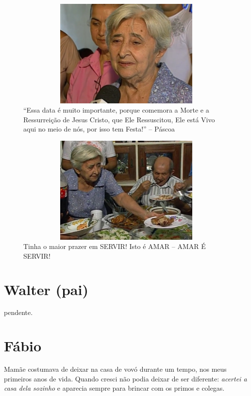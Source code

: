 \documentclass[
  brazil,
  a6paper,
  oneside,
  landscape,
  14pt]{scrbook}
\begin{document}
\begin{figure}
\centering
\includegraphics[width=4.49768in,height=2.13048in]{img/lourdes/image3.jpeg}
\caption{``Essa data é muito importante, porque comemora a Morte e a
Ressurreição de Jesus Cristo, que Ele Ressuscitou, Ele está Vivo aqui no
meio de nós, por isso tem Festa!'' -- Páscoa}
\end{figure}

\begin{figure}
\centering
\includegraphics[width=4.47917in,height=2.12171in]{img/lourdes/image4.jpeg}
\caption{Tinha o maior prazer em SERVIR! Isto é AMAR -- AMAR É SERVIR!}
\end{figure}

\hypertarget{walter-pai}{%
\section{Walter (pai)}\label{walter-pai}}

pendente.

\hypertarget{fuxe1bio}{%
\section{Fábio}\label{fuxe1bio}}

Mamãe costumava de deixar na casa de vovó durante um tempo, nos meus
primeiros anos de vida. Quando cresci não podia deixar de ser diferente:
\emph{acertei a casa dela sozinho} e aparecia sempre para brincar com os
primos e colegas.
\end{document}

